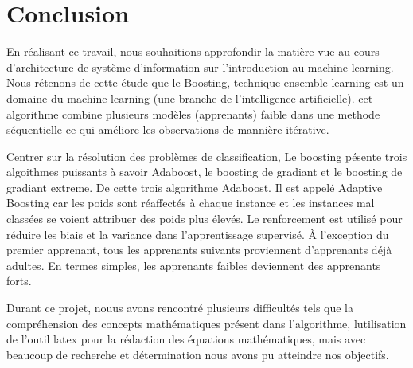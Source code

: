 \documentclass[french,a4paper,12pt]{article}
\begin{document}
\newpage
\section{Conclusion}
\quad En réalisant ce travail, nous souhaitions approfondir la matière vue au cours d'architecture de système d'information sur l'introduction au machine learning.
\quad  Nous rétenons de cette étude que le Boosting,  technique ensemble learning  est un domaine du machine learning (une branche de l'intelligence artificielle). cet algorithme combine plusieurs modèles (apprenants) faible dans une methode séquentielle ce qui améliore les observations de mannière itérative.

\quad Centrer sur la résolution des problèmes de classification, Le boosting pésente trois algoithmes puissants à savoir Adaboost, le boosting de gradiant et le boosting de gradiant extreme. De cette trois algorithme Adaboost. Il est appelé Adaptive Boosting car les poids sont réaffectés à chaque instance et les instances mal classées se voient attribuer des poids plus élevés. Le renforcement  est utilisé pour réduire les biais et la variance dans l'apprentissage supervisé. À l'exception du premier apprenant, tous les apprenants suivants proviennent d'apprenants déjà adultes. En termes simples, les apprenants faibles deviennent des apprenants forts.


\quad Durant ce projet, nouus avons rencontré plusieurs difficultés tels que la compréhension des concepts mathématiques présent dans l'algorithme, lutilisation de l'outil latex pour la rédaction des équations mathématiques, mais avec beaucoup de recherche et détermination  nous avons pu atteindre nos objectifs. 




\newpage
\begin{center}
\listoffigures
\end{center}

\newpage


\begin{center}


\end{center}
\end{document}
